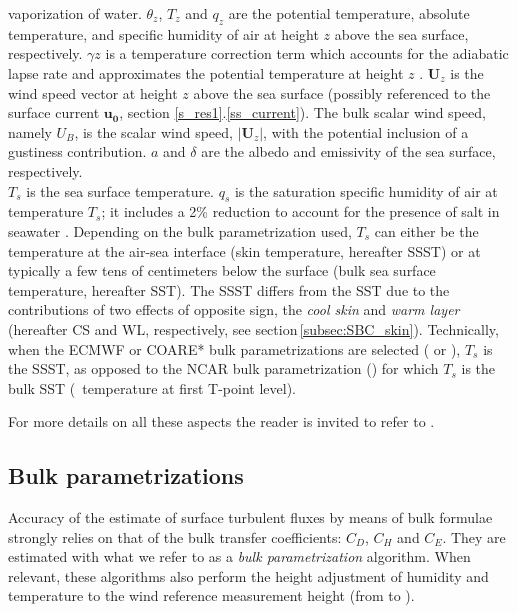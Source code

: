\documentclass[../main/NEMO_manual]{subfiles}
\begin{document}
vaporization of water.
%
$\theta_z$, $T_z$ and $q_z$ are the potential temperature, absolute temperature,
and specific humidity of air at height $z$ above the sea surface,
respectively. $\gamma z$ is a temperature correction term which accounts for the
adiabatic lapse rate and approximates the potential temperature at height
$z$ \citep{josey.gulev.ea_2013}.
%
$\mathbf{U}_z$ is the wind speed vector at height $z$ above the sea surface
(possibly referenced to the surface current $\mathbf{u_0}$,
section \ref{s_res1}.\ref{ss_current}).
%
The bulk scalar wind speed, namely $U_B$, is the scalar wind speed,
$|\mathbf{U}_z|$, with the potential inclusion of a gustiness contribution.
%
$a$ and $\delta$ are the albedo and emissivity of the sea surface, respectively.\\
%
%
$T_s$ is the sea surface temperature. $q_s$ is the saturation specific humidity
of air at temperature $T_s$; it includes a 2\% reduction to account for the
presence of salt in seawater \citep{sverdrup.johnson.ea_1942,kraus.businger_QJRMS96}.
Depending on the bulk parametrization used, $T_s$ can either be the temperature
at the air-sea interface (skin temperature, hereafter SSST) or at typically a
few tens of centimeters below the surface (bulk sea surface temperature,
hereafter SST).
%
The SSST differs from the SST due to the contributions of two effects of
opposite sign, the \emph{cool skin} and \emph{warm layer} (hereafter CS and WL,
respectively, see section\,\ref{subsec:SBC_skin}).
%
Technically, when the ECMWF or COARE* bulk parametrizations are selected
( or ),
$T_s$ is the SSST, as opposed to the NCAR bulk parametrization
() for which $T_s$ is the bulk SST (\ie~temperature
at first T-point level).

For more details on all these aspects the reader is invited to refer
to \citet{brodeau.barnier.ea_JPO17}.



\subsection{Bulk parametrizations}\label{subsec:SBC_blk_ocean}

Accuracy of the estimate of surface turbulent fluxes by means of bulk formulae
strongly relies on that of the bulk transfer coefficients: $C_D$, $C_H$ and
$C_E$. They are estimated with what we refer to as a \emph{bulk
parametrization} algorithm. When relevant, these algorithms also perform the
height adjustment of humidity and temperature to the wind reference measurement
height (from  to ).
\end{document}
